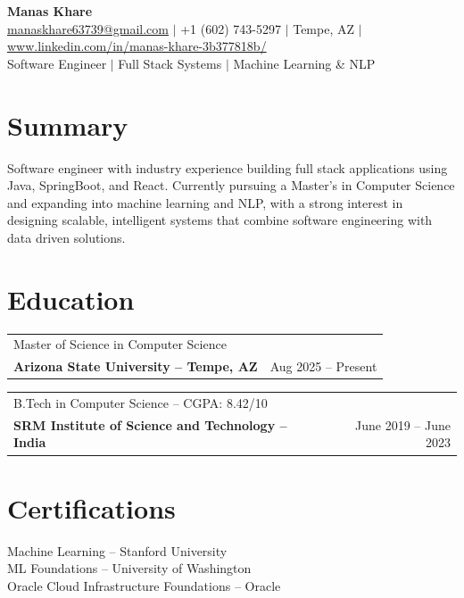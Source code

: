 \documentclass[10pt,letterpaper]{article}
\makeatletter
\newcommand{\entry}[4]{%
  \begin{tabularx}{\textwidth}{@{}X r@{}}
    #1 & #2 \\
    \textbf{#3} & #4 \\
  \end{tabularx}\vspace{-1pt}}
\makeatother
\begin{document}
\begin{center}
  {\fontsize{26}{30}\selectfont\bfseries Manas Khare}\\[3pt]
  \href{mailto:manaskhare63739@gmail.com}{manaskhare63739@gmail.com} $|$ +1 (602) 743-5297 $|$ Tempe, AZ $|$
  \href{https://www.linkedin.com/in/manas-khare-3b377818b/}{www.linkedin.com/in/manas-khare-3b377818b/}\\
  Software Engineer $|$ Full Stack Systems $|$ Machine Learning \& NLP
\end{center}

\section*{Summary}
Software engineer with industry experience building full stack applications using Java, SpringBoot, and React. Currently
pursuing a Master's in Computer Science and expanding into machine learning and NLP, with a strong interest in designing
scalable, intelligent systems that combine software engineering with data driven solutions.

\section*{Education}
\entry{Master of Science in Computer Science}{}{Arizona State University -- Tempe, AZ}{Aug 2025 -- Present}
\entry{B.Tech in Computer Science -- CGPA: 8.42/10}{}{SRM Institute of Science and Technology -- India}{June 2019 -- June 2023}

\section*{Certifications}
Machine Learning -- Stanford University\\
ML Foundations -- University of Washington\\
Oracle Cloud Infrastructure Foundations -- Oracle

\end{document}
